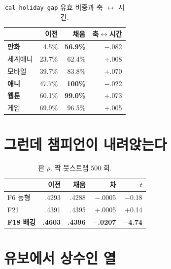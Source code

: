 \documentclass[10pt]{article}
\begin{document}
\begin{table}[t]
\centering\tsize
\caption{\texttt{cal\_holiday\_gap} 유효 비중과 축 $\leftrightarrow$ 시간.}
\begin{tabular}{lrrr}
\toprule
& 이전 & 채움 & 축$\leftrightarrow$시간 \\
\midrule
\textbf{만화} & 4.5\% & \textbf{56.9\%} & $-$.082 \\
세계애니 & 23.7\% & 62.4\% & $+$.008 \\
모바일 & 39.7\% & 83.8\% & $+$.070 \\
\textbf{애니} & 47.7\% & \textbf{100\%} & $-$.022 \\
\textbf{웹툰} & 60.1\% & \textbf{99.0\%} & $+$.073 \\
게임 & 69.9\% & 96.5\% & $+$.005 \\
\bottomrule
\end{tabular}
\end{table}


\section{그런데 챔피언이 내려앉는다}

\begin{table}[t]
\centering\tsize
\caption{판 $\rho$. 짝 붓스트랩 500 회.}
\begin{tabular}{lrrrr}
\toprule
& 이전 & 채움 & 차 & $t$ \\
\midrule
F6 능형 & .4293 & .4288 & $-$.0005 & $-$0.18 \\
F21 & .4391 & .4395 & $+$.0005 & $+$0.14 \\
\textbf{F18 배깅} & \textbf{.4603} & \textbf{.4396} & \textbf{$-$.0207} & \textbf{$-$4.74} \\
\bottomrule
\end{tabular}
\end{table}


\section{유보에서 상수인 열}
\end{document}

